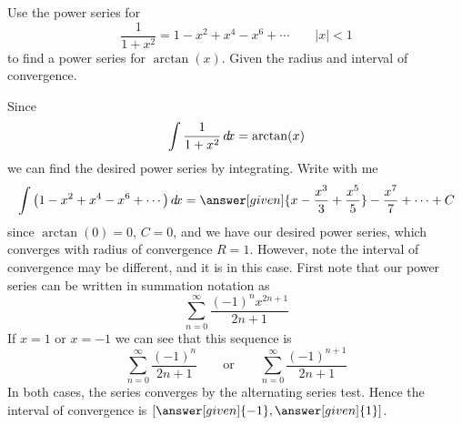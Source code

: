 \documentclass{ximera}
\begin{document}
\begin{example}
  Use the power series for
  \[
  \frac{1}{1+x^2} = 1 - x^2 + x^4 - x^6 + \cdots \qquad|x|< 1 
  \]
  to find a power series for $\arctan(x)$. Given the radius and interval of convergence.
  \begin{explanation}
    Since
    \[
    \int\frac{1}{1+x^2} \mathop{}\!d\! x = \arctan(x)
    \]
    we can find the desired power series by integrating. Write with me
    \[
    \int \left(1 - x^2 + x^4 - x^6 + \cdots\right)\d x = \answer[given]{x - \frac{x^3}{3} + \frac{x^5}{5}} - \frac{x^7}{7} + \cdots +C
    \]
    since $\arctan(0) = 0$, $C=0$, and we have our desired power
    series, which converges with radius of convergence $R=1$. However,
    note the interval of convergence may be different, and it is in
    this case. First note that our power series can be written in summation notation as
    \[
    \sum_{n=0}^\infty \frac{(-1)^n x^{2n+1}}{2n+1}
    \]
    If $x=1$ or $x=-1$ we can see that this sequence is
    \[
    \sum_{n=0}^\infty \frac{(-1)^n}{2n+1}\qquad\text{or}\qquad\sum_{n=0}^\infty \frac{(-1)^{n+1}}{2n+1}
    \]
    In both cases, the series converges by the alternating series
    test. Hence the interval of convergence is $[\answer[given]{-1},\answer[given]{1}]$.
  \end{explanation}
\end{example}
\end{document}
